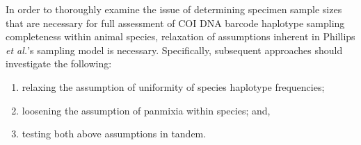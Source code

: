 In order to thoroughly examine the issue of determining specimen sample sizes that are necessary for full assessment of COI DNA barcode haplotype sampling completeness within animal species, relaxation of assumptions inherent in Phillips \textit{et al.}'s \cite{phillips2015exploration} sampling model is necessary. Specifically, subsequent approaches should investigate the following:

\begin{enumerate}

\item relaxing the assumption of uniformity of species haplotype frequencies;

\vspace{1mm}

\item loosening the assumption of panmixia within species; and,

\vspace{1mm}

\item testing both above assumptions in tandem.

\end{enumerate}

